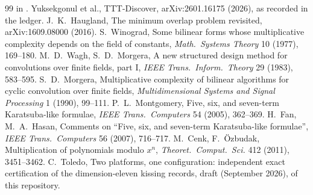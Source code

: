 \documentclass[11pt]{article}
\begin{document}
\begin{thebibliography}{99}
in .
 Yuksekgonul et al., TTT-Discover, arXiv:2601.16175 (2026), as recorded in the ledger.
 J.~K.~Haugland, The minimum overlap problem revisited, arXiv:1609.08000 (2016).
 S.~Winograd, Some bilinear forms whose multiplicative complexity depends on the field of constants, \emph{Math.\ Systems Theory} 10 (1977), 169--180.
 M.~D.~Wagh, S.~D.~Morgera, A new structured design method for convolutions over finite fields, part I, \emph{IEEE Trans.\ Inform.\ Theory} 29 (1983), 583--595.
 S.~D.~Morgera, Multiplicative complexity of bilinear algorithms for cyclic convolution over finite fields, \emph{Multidimensional Systems and Signal Processing} 1 (1990), 99--111.
 P.~L.~Montgomery, Five, six, and seven-term Karatsuba-like formulae, \emph{IEEE Trans.\ Computers} 54 (2005), 362--369.
 H.~Fan, M.~A.~Hasan, Comments on ``Five, six, and seven-term Karatsuba-like formulae'', \emph{IEEE Trans.\ Computers} 56 (2007), 716--717.
 M.~Cenk, F.~\"Ozbudak, Multiplication of polynomials modulo $x^n$, \emph{Theoret.\ Comput.\ Sci.} 412 (2011), 3451--3462.
 C.~Toledo, Two platforms, one configuration: independent exact certification of the dimension-eleven kissing records, draft (September 2026),  of this repository.
\end{thebibliography}
\end{document}
